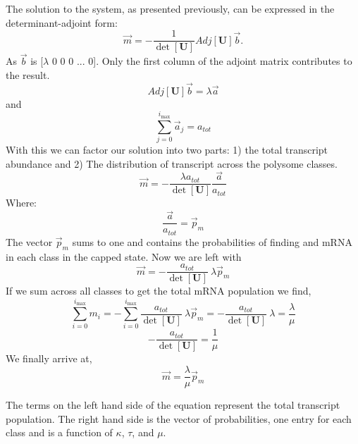 \documentclass[a4,center,fleqn,nocrop]{NAR}
\newcommand{\imax}{\ensuremath{{i_{\max}}}\xspace}
\let\bs\boldsymbol
\begin{document}
The solution to the system, as presented previously, can be expressed in the determinant-adjoint form:
	\begin{equation*}
		\vec{m}=-\frac{1}{\det[\bs{U}]}Adj[\bs{U}]\vec{b}.
	\end{equation*}
As $\vec{b}$ is [$\lambda$ 0 0 0 ... 0]. Only the first column of the adjoint matrix contributes to the result. 
	\begin{equation*}
		Adj[\bs{U}]\vec{b} = \lambda\vec{a}
	\end{equation*}	
and
	\begin{equation*}
		\sum_{j=0}^{\imax}\vec{a}_j = a_{tot} 
	\end{equation*}
With this we can factor our solution into two parts: 1) the total transcript abundance and 2) The distribution of transcript across the polysome classes.
	\begin{equation*}
		\vec{m}=-\frac{\lambda a_{tot}}{\det[\bs{U}]} \frac{\vec{a}}{a_{tot}} 
	\end{equation*}
Where:
	\begin{equation*}
		\frac{\vec{a}}{a_{tot}} = \vec{p}_m
	\end{equation*}
The vector $\vec{p}_m$ sums to one and contains the probabilities of finding and mRNA in each class in the capped state. Now we are left with
	\begin{equation*}
		\vec{m}=-\frac{a_{tot}}{\det[\bs{U}]} \: \lambda\vec{p}_m
	\end{equation*}
If we sum across all classes to get the total mRNA population we find,
	\begin{equation*}
		\sum_{i=0}^{\imax}m_{i} =-\sum_{i=0}^{\imax} \frac{a_{tot}}{\det[\bs{U}]} \: \lambda\vec{p}_m =-\frac{a_{tot}}{\det[\bs{U}]} \: \lambda = \frac{\lambda}{\mu}
	\end{equation*}
	\begin{equation*}
		-\frac{a_{tot}}{\det[\bs{U}]} = \frac{1}{\mu}
	\end{equation*}
We finally arrive at,
	\begin{equation} 
		\vec{m}=\frac{\lambda}{\mu}\vec{p}_m
	\end{equation}


The terms on the left hand side of the equation represent the total transcript population. The right hand side is the vector of probabilities, one entry for each class and is a function of $\kappa$, $\tau$, and $\mu$.	



%

\end{document}
